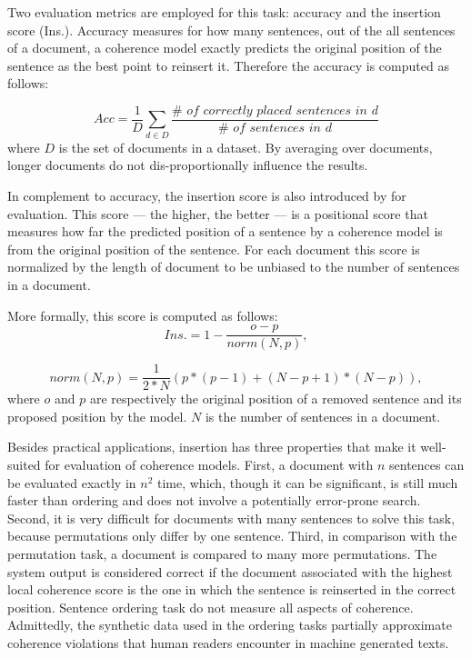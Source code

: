 Two evaluation metrics are employed for this task: accuracy and the insertion score (Ins.). 
Accuracy measures for how many sentences, out of the all sentences of a document, a coherence model exactly predicts the original position of the sentence as the best point to reinsert it. 
Therefore the accuracy is computed as follows:

\begin{equation}
Acc = \frac{1}{D}\sum_{d \in D}\frac{\#\textit{ of correctly placed sentences in d}}{\#\textit{ of sentences in d}}
\end{equation}
%
where $D$ is the set of documents in a dataset.  
By averaging over documents, longer documents do not dis-proportionally influence the results. 

In complement to accuracy, the insertion score is also introduced by  for evaluation. 
This score  –-- the higher, the better –--  is a positional score that measures how far the predicted position of a sentence by a coherence model is from the original position of the sentence. 
For each document this score is normalized by the length of document to be unbiased to the number of sentences in a document. 

More formally, this score is computed as follows:
\begin{equation}
Ins. = 1 - \frac{o - p}{norm(N, p)},
\end{equation}

\begin{equation}
norm(N, p) = \frac{1}{2*N} (p * (p-1) + (N - p + 1)*(N - p)),
\end{equation}
where $o$ and $p$ are respectively the original position of a removed sentence and its proposed position by the model. 
$N$ is the number of sentences in a document.  


Besides practical applications, insertion has three properties that make it well-suited for evaluation of coherence models. 
First, a document with $n$ sentences can be evaluated exactly in $n^2$ time, which, though it can be significant, is still much faster than ordering and does not involve a potentially error-prone search.
Second, it is very difficult for documents with many sentences to solve this task, because permutations only differ by one sentence.  
Third, in comparison with the permutation task, a document is compared to many more permutations. 
The system output is considered correct if the document associated with the highest local coherence score is the one in which the sentence is reinserted in the correct position. 
Sentence ordering task do not measure all aspects of coherence. 
Admittedly, the synthetic data used in the ordering tasks partially approximate coherence violations that human readers encounter in machine generated texts. 



